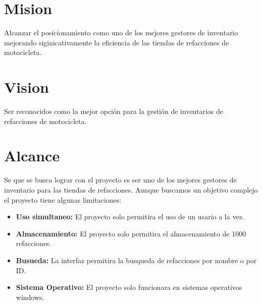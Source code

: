 \section*{Mision}

    Alcanzar el posicionamiento como uno de los mejores gestores de inventario
    mejorando siginicativamente la eficiencia de las tiendas de refacciones de motocicleta.

\section*{Vision}

    Ser reconocidos como la mejor opción para la gestión de inventarios de refacciones de motocicleta.

\section*{Alcance} Se que se busca lograr con el proyecto es 
ser uno de los mejores gestores de inventario para las tiendas de refacciones.
\newline
Aunque buscamos un objetivo complejo el proyecto tiene algunas limitaciones:

\begin{itemize}
    \item \textbf{Uso simultaneo:} El proyecto solo permitira el uso de un usario a la vez.
    \item \textbf{Almacenamiento:} El proyecto solo permitira el almacenamiento de 1000 refacciones.
    \item \textbf{Busueda:} La interfaz permitira la busqueda de refacciones por nombre o por ID.
    \item \textbf{Sistema Operativo:} El proyecto solo funcionara en sistemas operativos windows.
\end{itemize}